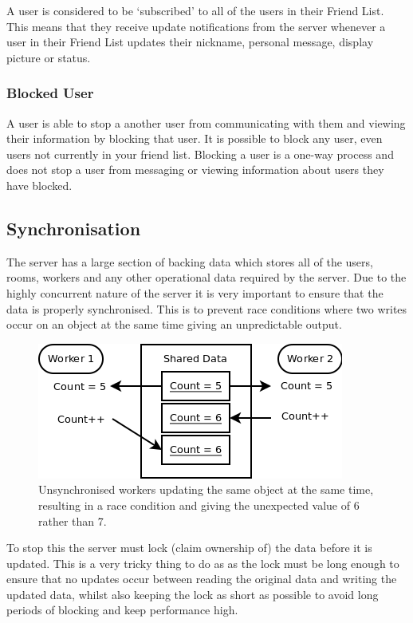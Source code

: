 A user is considered to be `subscribed' to all of the users in their Friend List. This means that they receive update notifications from the server whenever a user in their Friend List updates their nickname, personal message, display picture or status.

\subsubsection{Blocked User}
A user is able to stop a another user from communicating with them and viewing their information by blocking that user. It is possible to block any user, even users not currently in your friend list. Blocking a user is a one-way process and does not stop a user from messaging or viewing information about users they have blocked.

\subsection{Synchronisation}

The server has a large section of backing data which stores all of the users, rooms, workers and any other operational data required by the server. Due to the highly concurrent nature of the server it is very important to ensure that the data is properly synchronised. This is to prevent race conditions where two writes occur on an object at the same time giving an unpredictable output. 

\begin{figure}[!h]
    \begin{center}
        \includegraphics[scale=0.6]{Design/diagrams/server_race_condition.png}
        \caption{Unsynchronised workers updating the same object at the same time, resulting in a race condition and giving the unexpected value of 6 rather than 7.}
        \label{RaceConditionDia}
    \end{center}
\end{figure}

To stop this the server must lock (claim ownership of) the data before it is updated. This is a very tricky thing to do as as the lock must be long enough to ensure that no updates occur between reading the original data and writing the updated data, whilst also keeping the lock as short as possible to avoid long periods of blocking and keep performance high.

